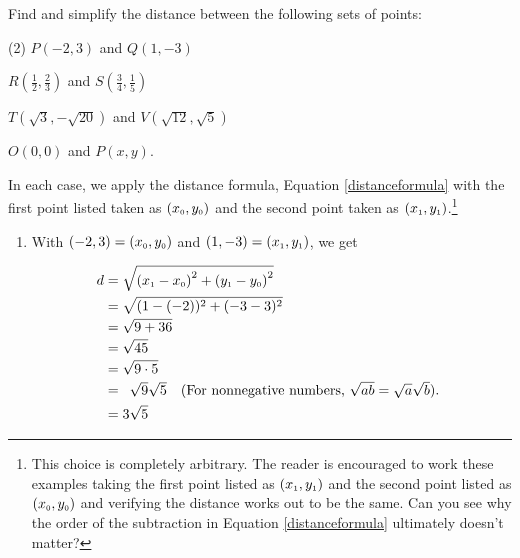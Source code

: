\begin{ex} \label{distanceexample1} Find and simplify the distance between the following sets of points:

\begin{tasks}(2)
\task $P(-2,3)$ and  $Q(1,-3)$ 

\task $R\left( \frac{1}{2}, \frac{2}{3}\right)$ and $S\left( \frac{3}{4}, \frac{1}{5}\right)$ 

\task*  $T(\sqrt{3}, -\sqrt{20})$ and $V(\sqrt{12}, \sqrt{5})$

\task   $O(0,0)$ and $P(x,y)$. 

\end{tasks}

  In each case, we apply the distance formula, Equation \ref{distanceformula} with the first point listed taken as  $\left(x_{\mbox{\tiny$0$}}, y_{\mbox{\tiny$0$}}\right)$ and the second point taken as $\left(x_{\mbox{\tiny$1$}}, y_{\mbox{\tiny$1$}}\right)$.\footnote{This choice is completely arbitrary.  The reader is encouraged to work these examples taking the first point listed as $\left(x_{\mbox{\tiny$1$}}, y_{\mbox{\tiny$1$}}\right)$ and the second point listed as $\left(x_{\mbox{\tiny$0$}}, y_{\mbox{\tiny$0$}}\right)$ and verifying the distance works out to be the same.  Can you see why the order of the subtraction in Equation \ref{distanceformula} ultimately doesn't matter?}

\begin{enumerate}

\item With $(-2,3) =  \left(x_{\mbox{\tiny$0$}}, y_{\mbox{\tiny$0$}}\right)$ and  $(1,-3) = \left(x_{\mbox{\tiny$1$}}, y_{\mbox{\tiny$1$}}\right)$, we get

\setlength{\extrarowheight}{3pt}

\begin{align*}
 d & = \sqrt{\left(x_{\mbox{\tiny$1$}} - x_{\mbox{\tiny$0$}} \right)^2 + \left(y_{\mbox{\tiny$1$}} - y_{\mbox{\tiny$0$}} \right)^2} \\
   & = \sqrt{ (1-(-2))^2 + (-3-3)^2} \\
   & = \sqrt{9 + 36} \\
   & = \sqrt{45} \\
   & = \sqrt{9 \cdot 5} \\
   & = \begin{array}{lr} \sqrt{9} \sqrt{5} & \text{(For nonnegative numbers, $\sqrt{ab} = \sqrt{a} \sqrt{b}$).} \end{array} \\
   & = 3 \sqrt{5}
\end{align*}


\end{enumerate}
\end{ex}
